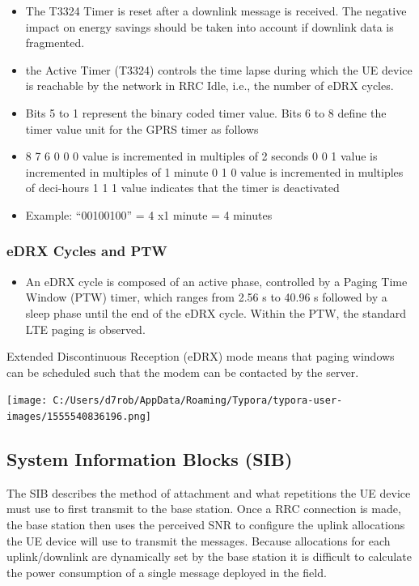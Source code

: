 \documentclass[]{article}
\providecommand{\tightlist}{%
  \setlength{\itemsep}{0pt}\setlength{\parskip}{0pt}}
\let\origfigure\figure
\let\endorigfigure\endfigure
\renewenvironment{figure}[1][2] {
    \expandafter\origfigure\expandafter[H]
} {
    \endorigfigure
}
\begin{document}
\begin{itemize}
\item
  The T3324 Timer is reset after a downlink message is received. The
  negative impact on energy savings should be taken into account if
  downlink data is fragmented.
\item
  the Active Timer (T3324) controls the time lapse during which the UE
  device is reachable by the network in RRC Idle, i.e., the number of
  eDRX cycles.
\item
  Bits 5 to 1 represent the binary coded timer value. Bits 6 to 8 define
  the timer value unit for the GPRS timer as follows
\item
  8 7 6 0 0 0 value is incremented in multiples of 2 seconds 0 0 1 value
  is incremented in multiples of 1 minute 0 1 0 value is incremented in
  multiples of deci-hours 1 1 1 value indicates that the timer is
  deactivated
\item
  Example: ``00100100'' = 4 x1 minute = 4 minutes
\end{itemize}

\hypertarget{edrx-cycles-and-ptw}{%
\subsubsection{eDRX Cycles and PTW}\label{edrx-cycles-and-ptw}}

\begin{itemize}
\tightlist
\item
  An eDRX cycle is composed of an active phase, controlled by a Paging
  Time Window (PTW) timer, which ranges from 2.56 s to 40.96 s followed
  by a sleep phase until the end of the eDRX cycle. Within the PTW, the
  standard LTE paging is observed.
\end{itemize}

Extended Discontinuous Reception (eDRX) mode means that paging windows
can be scheduled such that the modem can be contacted by the server.

\begin{figure}
\centering
\texttt{[image: C:/Users/d7rob/AppData/Roaming/Typora/typora-user-images/1555540836196.png]}
\caption{eDRX mode}
\end{figure}

\hypertarget{sib}{%
\subsection{System Information Blocks (SIB)}\label{sib}}

The SIB describes the method of attachment and what repetitions the UE
device must use to first transmit to the base station. Once a RRC
connection is made, the base station then uses the perceived SNR to
configure the uplink allocations the UE device will use to transmit the
messages. Because allocations for each uplink/downlink are dynamically
set by the base station it is difficult to calculate the power
consumption of a single message deployed in the field.
\end{document}

